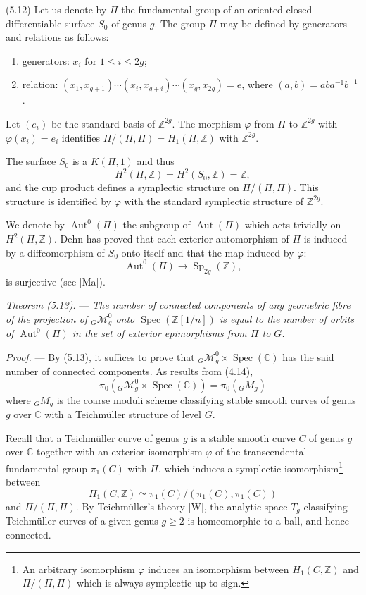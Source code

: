 \documentclass[10pt]{article}
\newcommand{\Spec}{\operatorname{Spec}}
\newcommand{\Aut}{\operatorname{Aut}}
\begin{document}
\medskip
\noindent(5.12) Let us denote by $\Pi$ the fundamental group of an oriented closed differentiable surface $S_0$ of genus $g$. The group $\Pi$ may be defined by generators and relations as follows:
\begin{enumerate}[label=(\roman*)]
\item generators: $x_i$ for $1\leq i\leq 2g$;
\item relation: $(x_1,x_{g+1})\cdots(x_i,x_{g+i})\cdots(x_g,x_{2g})=e$, where $(a,b)=aba^{-1}b^{-1}$.
\end{enumerate}
Let $(e_i)$ be the standard basis of $\mathbb Z^{2g}$. The morphism $\varphi$ from $\Pi$ to $\mathbb Z^{2g}$ with $\varphi(x_i)=e_i$ identifies $\Pi/(\Pi,\Pi)=H_1(\Pi,\mathbb Z)$ with $\mathbb Z^{2g}$.

The surface $S_0$ is a $K(\Pi,1)$ and thus
\[
H^2(\Pi,\mathbb Z)=H^2(S_0,\mathbb Z)=\mathbb Z,
\]
and the cup product defines a symplectic structure on $\Pi/(\Pi,\Pi)$. This structure is identified by $\varphi$ with the standard symplectic structure of $\mathbb Z^{2g}$.

We denote by $\Aut^0(\Pi)$ the subgroup of $\Aut(\Pi)$ which acts trivially on $H^2(\Pi,\mathbb Z)$. Dehn has proved that each exterior automorphism of $\Pi$ is induced by a diffeomorphism of $S_0$ onto itself and that the map induced by $\varphi$:
\[
\Aut^0(\Pi)\longrightarrow \operatorname{Sp}_{2g}(\mathbb Z),
\]
is surjective (see [Ma]).

\medskip
\noindent\emph{Theorem (5.13).} --- \emph{The number of connected components of any geometric fibre of the projection of ${}_G\mathcal M_g^0$ onto $\Spec(\mathbb Z[1/n])$ is equal to the number of orbits of $\Aut^0(\Pi)$ in the set of exterior epimorphisms from $\Pi$ to $G$.}

\noindent\emph{Proof.} --- By (5.13), it suffices to prove that ${}_G\mathcal M_g^0\times\Spec(\mathbb C)$ has the said number of connected components. As results from (4.14),
\[
\pi_0({}_G\mathcal M_g^0\times\Spec(\mathbb C))=\pi_0({}_GM_g)
\]
where ${}_GM_g$ is the coarse moduli scheme classifying stable smooth curves of genus $g$ over $\mathbb C$ with a Teichmüller structure of level $G$.

Recall that a Teichmüller curve of genus $g$ is a stable smooth curve $C$ of genus $g$ over $\mathbb C$ together with an exterior isomorphism $\varphi$ of the transcendental fundamental group $\pi_1(C)$ with $\Pi$, which induces a symplectic isomorphism\footnote{An arbitrary isomorphism $\varphi$ induces an isomorphism between $H_1(C,\mathbb Z)$ and $\Pi/(\Pi,\Pi)$ which is always symplectic up to sign.} between
\[
H_1(C,\mathbb Z)\simeq \pi_1(C)/(\pi_1(C),\pi_1(C))
\]
and $\Pi/(\Pi,\Pi)$. By Teichmüller's theory [W], the analytic space $T_g$ classifying Teichmüller curves of a given genus $g\geq2$ is homeomorphic to a ball, and hence connected.
\end{document}
